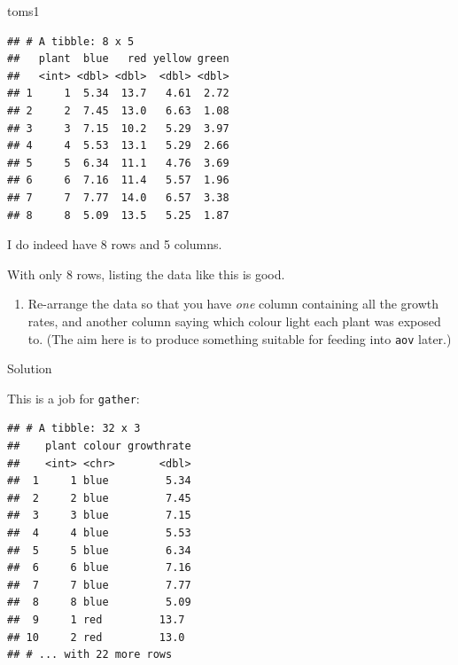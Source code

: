 \documentclass[]{tufte-book}
\newenvironment{Shaded}{}{}
\newcommand{\KeywordTok}[1]{\textcolor[rgb]{0.00,0.44,0.13}{\textbf{#1}}}
\newcommand{\NormalTok}[1]{#1}
\newcommand{\OperatorTok}[1]{\textcolor[rgb]{0.40,0.40,0.40}{#1}}
\newcommand{\StringTok}[1]{\textcolor[rgb]{0.25,0.44,0.63}{#1}}
\providecommand{\tightlist}{%
  \setlength{\itemsep}{0pt}\setlength{\parskip}{0pt}}
\theoremstyle{definition}
\theoremstyle{definition}
\theoremstyle{definition}
\theoremstyle{remark}
\begin{document}
\begin{Shaded}
\begin{Highlighting}[]
\NormalTok{toms1}
\end{Highlighting}
\end{Shaded}

\begin{verbatim}
## # A tibble: 8 x 5
##   plant  blue   red yellow green
##   <int> <dbl> <dbl>  <dbl> <dbl>
## 1     1  5.34  13.7   4.61  2.72
## 2     2  7.45  13.0   6.63  1.08
## 3     3  7.15  10.2   5.29  3.97
## 4     4  5.53  13.1   5.29  2.66
## 5     5  6.34  11.1   4.76  3.69
## 6     6  7.16  11.4   5.57  1.96
## 7     7  7.77  14.0   6.57  3.38
## 8     8  5.09  13.5   5.25  1.87
\end{verbatim}

I do indeed have 8 rows and 5 columns.

With only 8 rows, listing the data like this is good.

\begin{enumerate}
\def\labelenumi{(\alph{enumi})}
\setcounter{enumi}{1}
\tightlist
\item
  Re-arrange the data so that you have \emph{one} column containing all
  the growth rates, and another column saying which colour light each
  plant was exposed to. (The aim here is to produce something suitable
  for feeding into \texttt{aov} later.)
\end{enumerate}

Solution

This is a job for \texttt{gather}:

\begin{Shaded}
\end{Shaded}

\begin{verbatim}
## # A tibble: 32 x 3
##    plant colour growthrate
##    <int> <chr>       <dbl>
##  1     1 blue         5.34
##  2     2 blue         7.45
##  3     3 blue         7.15
##  4     4 blue         5.53
##  5     5 blue         6.34
##  6     6 blue         7.16
##  7     7 blue         7.77
##  8     8 blue         5.09
##  9     1 red         13.7 
## 10     2 red         13.0 
## # ... with 22 more rows
\end{verbatim}
\end{document}
